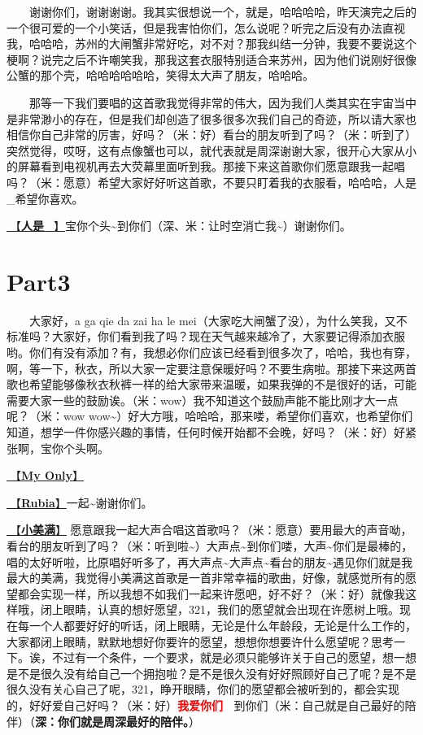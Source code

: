 \documentclass[]{ctexbook}
\begin{document}
  谢谢你们，谢谢谢谢。我其实很想说一个，就是，哈哈哈哈，昨天演完之后的一个很可爱的一个小笑话，但是我害怕你们，怎么说呢？听完之后没有办法直视我，哈哈哈，苏州的大闸蟹非常好吃，对不对？那我纠结一分钟，我要不要说这个梗啊？说完之后不许嘲笑我，那我这套衣服特别适合来苏州，因为他们说刚好很像公蟹的那个壳，哈哈哈哈哈哈，笑得太大声了朋友，哈哈哈。

  那等一下我们要唱的这首歌我觉得非常的伟大，因为我们人类其实在宇宙当中是非常渺小的存在，但是我们却创造了很多很多次我们自己的奇迹，所以请大家也相信你自己非常的厉害，好吗？（米：好）看台的朋友听到了吗？（米：听到了）突然觉得，哎呀，这有点像蟹也可以，就代表就是周深谢谢大家，很开心大家从小的屏幕看到电视机再去大荧幕里面听到我。那接下来这首歌你们愿意跟我一起唱吗？（米：愿意）希望大家好好听这首歌，不要只盯着我的衣服看，哈哈哈，人是\_希望你喜欢。

\hyperref[renshi]{🎵【\textbf{人是\_}】}宝你个头\textasciitilde 到你们（深、米：让时空消亡我\textasciitilde）谢谢你们。

\section{Part3}\label{suzhou-20241110-part3}

  大家好，a ga qie da zai ha le mei（大家吃大闸蟹了没），为什么笑我，又不标准吗？大家好，你们看到我了吗？现在天气越来越冷了，大家要记得添加衣服哟。你们有没有添加？有，我想必你们应该已经看到很多次了，哈哈，我也有穿，啊，等一下，秋衣，所以大家一定要注意保暖好吗？不要生病啦。那接下来这两首歌也希望能够像秋衣秋裤一样的给大家带来温暖，如果我弹的不是很好的话，可能需要大家一些的鼓励诶。（米：wow）我不知道这个鼓励声能不能比刚才大一点呢？（米：wow wow\textasciitilde）好大方哦，哈哈哈，那来喽，希望你们喜欢，也希望你们知道，想学一件你感兴趣的事情，任何时候开始都不会晚，好吗？（米：好）好紧张啊，宝你个头啊。

\hyperref[my-only]{🎵【\textbf{My Only}】}

\hyperref[rubia]{🎵【\textbf{Rubia}】}一起\textasciitilde 谢谢你们。

\hyperref[happy-ending]{🎵【\textbf{小美满}】} 愿意跟我一起大声合唱这首歌吗？（米：愿意）要用最大的声音呦，看台的朋友听到了吗？（米：听到啦\textasciitilde）大声点\textasciitilde 到你们喽，大声\textasciitilde 你们是最棒的，唱的太好听啦，比原唱好听多了，再大声点\textasciitilde 大声点\textasciitilde 看台的朋友\textasciitilde 遇见你们就是我最大的美满，我觉得小美满这首歌是一首非常幸福的歌曲，好像，就感觉所有的愿望都会实现一样，所以我想不如我们一起来许愿吧，好不好？（米：好）就像我这样哦，闭上眼睛，认真的想好愿望，321，我们的愿望就会出现在许愿树上哦。现在每一个人都要好好的听话，闭上眼睛，无论是什么年龄段，无论是什么工作的，大家都闭上眼睛，默默地想好你要许的愿望，想想你想要许什么愿望呢？思考一下。诶，不过有一个条件，一个要求，就是必须只能够许关于自己的愿望，想一想是不是很久没有给自己一个拥抱啦？是不是很久没有好好照顾好自己了呢？是不是很久没有关心自己了呢，321，睁开眼睛，你们的愿望都会被听到的，都会实现的，好好爱自己好吗？（米：好）\textbf{\textcolor{red}{我爱你们~ } } 到你们（米：自己就是自己最好的陪伴）（\textbf{深：你们就是周深最好的陪伴。}）
\end{document}

